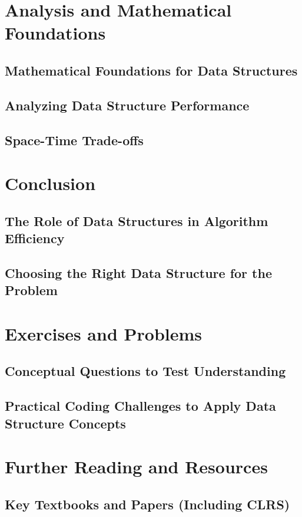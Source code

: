 \documentclass[12pt]{book} %
\begin{document}
\section{Analysis and Mathematical Foundations}
\subsection{Mathematical Foundations for Data Structures}
\subsection{Analyzing Data Structure Performance}
\subsection{Space-Time Trade-offs}

\section{Conclusion}
\subsection{The Role of Data Structures in Algorithm Efficiency}
\subsection{Choosing the Right Data Structure for the Problem}

\section{Exercises and Problems}
\subsection{Conceptual Questions to Test Understanding}
\subsection{Practical Coding Challenges to Apply Data Structure Concepts}

\section{Further Reading and Resources}
\subsection{Key Textbooks and Papers (Including CLRS)}
\end{document}
